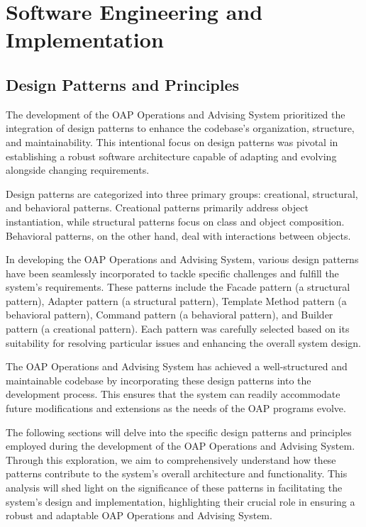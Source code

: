 \documentclass[12pt]{article}
\begin{document}
\section{Software Engineering and Implementation} 
\subsection{Design Patterns and Principles} 
The development of the OAP Operations and Advising System prioritized the integration of design patterns to enhance the codebase's organization, structure, and maintainability. This intentional focus on design patterns was pivotal in establishing a robust software architecture capable of adapting and evolving alongside changing requirements.

Design patterns are categorized into three primary groups: creational, structural, and behavioral patterns. Creational patterns primarily address object instantiation, while structural patterns focus on class and object composition. Behavioral patterns, on the other hand, deal with interactions between objects.

In developing the OAP Operations and Advising System, various design patterns have been seamlessly incorporated to tackle specific challenges and fulfill the system's requirements. These patterns include the Facade pattern (a structural pattern), Adapter pattern (a structural pattern), Template Method pattern (a behavioral pattern), Command pattern (a behavioral pattern), and Builder pattern (a creational pattern). Each pattern was carefully selected based on its suitability for resolving particular issues and enhancing the overall system design.

The OAP Operations and Advising System has achieved a well-structured and maintainable codebase by incorporating these design patterns into the development process. This ensures that the system can readily accommodate future modifications and extensions as the needs of the OAP programs evolve.

The following sections will delve into the specific design patterns and principles employed during the development of the OAP Operations and Advising System. Through this exploration, we aim to comprehensively understand how these patterns contribute to the system's overall architecture and functionality. This analysis will shed light on the significance of these patterns in facilitating the system's design and implementation, highlighting their crucial role in ensuring a robust and adaptable OAP Operations and Advising System.
\end{document}
